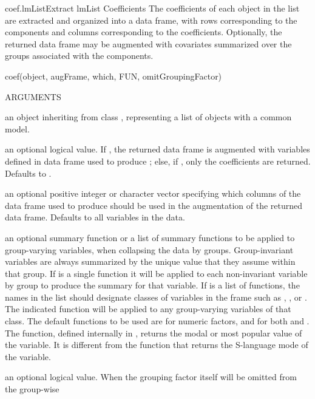 \documentclass[pdftex]{article} \usepackage{url,graphicx}
\begin{document}
\begin{Helpfile}{coef.lmList}{Extract lmList Coefficients}
The coefficients of each  object in the  list are
extracted and organized into a data frame, with rows corresponding to
the  components and columns corresponding to the
coefficients.  Optionally, the returned data frame may be augmented
with covariates summarized over the groups associated with the
 components.
\begin{Example}
coef(object, augFrame, which, FUN, omitGroupingFactor)
\end{Example}
\begin{Argument}{ARGUMENTS}
\item[\Co{object:}]
an object inheriting from class , representing
a list of  objects with a common model.
\item[\Co{augFrame:}]
an optional logical value. If , the returned
data frame is augmented with variables defined in data frame used to
produce ; else, if , only the coefficients
are returned. Defaults to .
\item[\Co{which:}]
an optional positive integer or character vector specifying which
columns of the data frame used to produce  should be used in
the augmentation of the returned data frame. Defaults to all variables
in the data.
\item[\Co{FUN:}]
an optional summary function or a list of summary functions
to be applied to group-varying variables, when collapsing the data
by groups.  Group-invariant variables are always summarized by the
unique value that they assume within that group. If  is a
single function it will be applied to each non-invariant variable by
group to produce the summary for that variable.  If  is a
list of functions, the names in the list should designate classes of
variables in the frame such as , , or
.  The indicated function will be applied to any
group-varying variables of that class.  The default functions to be
used are  for numeric factors, and  for both
 and .  The  function, defined
internally in , returns the modal or most popular
value of the variable.  It is different from the  function
that returns the S-language mode of the variable.
\item[\Co{omitGroupingFactor:}]
an optional logical value.  When 
the grouping factor itself will be omitted from the group-wise

\end{Argument}
\end{Helpfile}
\end{document}
